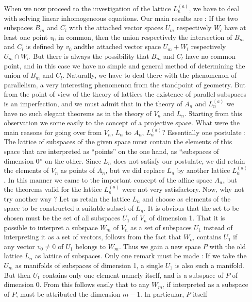 When we now proceed to the investigation of the lattice $L^{(a)}_n$,
we have to deal with solving linear inhomogeneous equations. Our main
results are : If the two subspaces $B_m$ and $C_l$ with the attached
vector spaces $U_m$ respectively $W_l$ have at least one point $v_0$
in common, then the union respectively the intersection of $B_m$ and
$C_l$ is defined by $v_0$ and\pageoriginale the attached vector space
$U_m + W_l$ respectively $U_m \cap W_l$. But there is always the
possibility that $B_m$ and $C_l$ have no common point, and in this
case we have no simple and general method of determining the union of
$B_m$ and $C_l$. Naturally, we have to deal there with the phenomenon
of parallelism, a very interesting  phenomenon from the standpoint of
geometry. But from the point of view of the theory of lattices the
existence of parallel subspaces is an imperfection, and we must admit
that in the theory of $A_n$ and $L^{(a)}_n$ we have no such elegant
theorems as in the theory of $V_n$ and $L_n$. Starting from this
observation we some easily to the concept of a projective space. What
were the main reasons for going over from $V_n$, $L_n$ to $A_n$,
$L^{(a)}_n ?$ Essentially one postulate : The lattice of subspaces of
the given space must contain the elements of this space that are
interpreted as ``points'' on the one hand, as  ``subspaces of
dimension 0'' on the other. Since $L_n$ does not satisfy our
postulate, we did retain the elements of $V_n$ as points of $A_n$, but
we did replace $L_n$ by another lattice $L^{(a)}_n$. In this manner we
came to the important concept of the affine space $A_n$, but the
theorems valid for the lattice $L^{(a)}_n$ were not very
satisfactory. Now, why not try another way ? Let us retain the lattice
$L_n$ and choose as elements of the space to be constructed a suitable
subset of $L_n$. It is obvious that the set to be chosen must be the
set of all subspaces $U_1$ of $V_n$ of dimension 1. That it is
possible to interpret a subspace $W_m$ of $V_n$ as a set of subspaces
$U_1$ instead of interpreting it as a set of vectors, follows from the
fact that $W_m$ contains $U_1$ if any vector $v_0 \neq 0$ of $U_1$
belongs to $W_m$. Thus we gain a new space $P$ with the old lattice
$L_n$ as lattice of subspaces. Only one remark must be made : If we
take the $U_m$ as manifolds of subspaces of dimension 1, a single
$U_1$ is also such a manifold. But then $U_1$ contains only one
element namely itself, and is a subspace of $P$ of dimension 0. From
this follows easily that to any $W_m$, if interpreted as a subspace of
$P$, must be attributed the dimension $m-1$. In particular, $P$ itself
